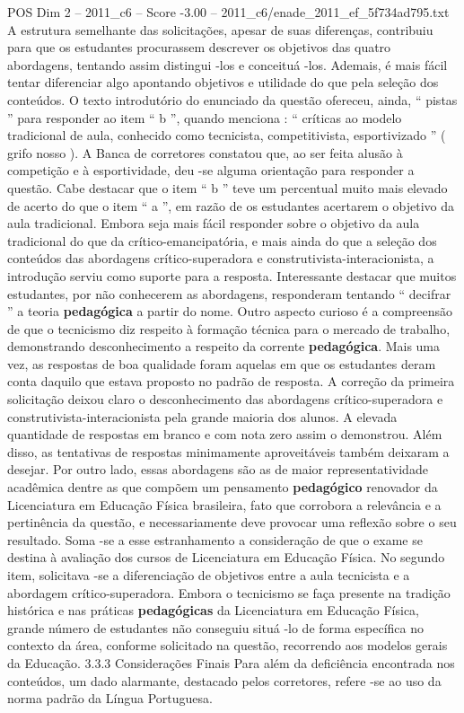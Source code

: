 \begin{textsample}{POS Dim 2 – 2011\_c6 – Score -3.00 – 2011\_c6/enade\_2011\_ef\_5f734ad795.txt}
A estrutura semelhante das solicitações, apesar de suas diferenças, contribuiu para que os estudantes procurassem descrever os objetivos das quatro abordagens, tentando assim distingui -los e conceituá -los.
Ademais, é mais fácil tentar diferenciar algo apontando objetivos e utilidade do que pela seleção dos conteúdos.
O texto introdutório do enunciado da questão ofereceu, ainda, “ pistas ” para responder ao item “ b ”, quando menciona : “ críticas ao modelo tradicional de aula, conhecido como tecnicista, competitivista, esportivizado ” ( grifo nosso ).
A Banca de corretores constatou que, ao ser feita alusão à competição e à esportividade, deu -se alguma orientação para responder a questão.
Cabe destacar que o item “ b ” teve um percentual muito mais elevado de acerto do que o item “ a ”, em razão de os estudantes acertarem o objetivo da aula tradicional.
Embora seja mais fácil responder sobre o objetivo da aula tradicional do que da crítico-emancipatória, e mais ainda do que a seleção dos conteúdos das abordagens crítico-superadora e construtivista-interacionista, a introdução serviu como suporte para a resposta.
Interessante destacar que muitos estudantes, por não conhecerem as abordagens, responderam tentando “ decifrar ” a teoria \textbf{pedagógica} a partir do nome.
Outro aspecto curioso é a compreensão de que o tecnicismo diz respeito à formação técnica para o mercado de trabalho, demonstrando desconhecimento a respeito da corrente \textbf{pedagógica}.
Mais uma vez, as respostas de boa qualidade foram aquelas em que os estudantes deram conta daquilo que estava proposto no padrão de resposta.
A correção da primeira solicitação deixou claro o desconhecimento das abordagens crítico-superadora e construtivista-interacionista pela grande maioria dos alunos.
A elevada quantidade de respostas em branco e com nota zero assim o demonstrou.
Além disso, as tentativas de respostas minimamente aproveitáveis também deixaram a desejar.
Por outro lado, essas abordagens são as de maior representatividade acadêmica dentre as que compõem um pensamento \textbf{pedagógico} renovador da Licenciatura em Educação Física brasileira, fato que corrobora a relevância e a pertinência da questão, e necessariamente deve provocar uma reflexão sobre o seu resultado.
Soma -se a esse estranhamento a consideração de que o exame se destina à avaliação dos cursos de Licenciatura em Educação Física.
No segundo item, solicitava -se a diferenciação de objetivos entre a aula tecnicista e a abordagem crítico-superadora.
Embora o tecnicismo se faça presente na tradição histórica e nas práticas \textbf{pedagógicas} da Licenciatura em Educação Física, grande número de estudantes não conseguiu situá -lo de forma específica no contexto da área, conforme solicitado na questão, recorrendo aos modelos gerais da Educação. 3.3.3 Considerações Finais Para além da deficiência encontrada nos conteúdos, um dado alarmante, destacado pelos corretores, refere -se ao uso da norma padrão da Língua Portuguesa.

\end{textsample}
